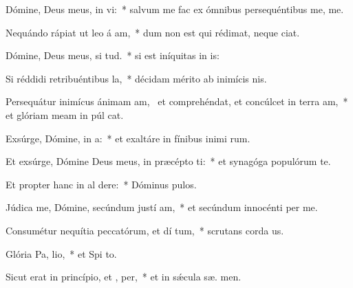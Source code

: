 \item Dómine, Deus meus, in  vi:~* salvum me fac ex ómnibus persequéntibus me,   me.
\item Nequándo rápiat ut leo á am,~* dum non est qui rédimat, neque   ciat.
\item Dómine, Deus meus, si  tud.~* si est iníquitas in  is:
\item Si réddidi retribuéntibus  la,~* décidam mérito ab inimícis  nis.
\item Persequátur inimícus ánimam am,~\pscross{} et comprehéndat, et concúlcet in terra  am,~* et glóriam meam in púl cat.
\item Exsúrge, Dómine, in  a:~* et exaltáre in fínibus inimi rum.
\item Et exsúrge, Dómine Deus meus, in præcépto  ti:~* et synagóga populórum  te.
\item Et propter hanc in al dere:~* Dóminus  pulos.
\item Júdica me, Dómine, secúndum justí am,~* et secúndum innocénti  per me.
\item Consumétur nequítia peccatórum, et dí tum,~* scrutans corda   us.
\item Glória Pa,  lio,~* et Spi to.
\item Sicut erat in princípio, et ,  per,~* et in sǽcula sæ. men.
